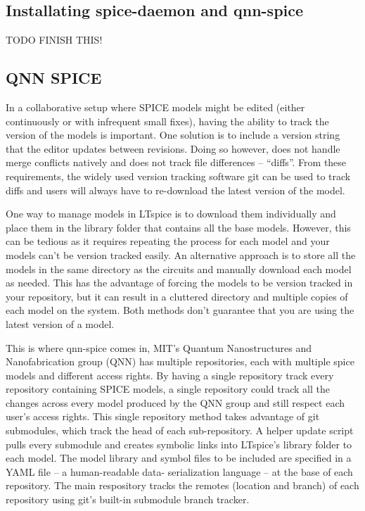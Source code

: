 







\subsection{Installating spice-daemon and qnn-spice}

TODO FINISH THIS!

\subsection{QNN SPICE} \label{qnn-spice}

In a collaborative setup where SPICE models might be edited (either continuously or with infrequent small fixes), 
having the ability to track the version of the models is important. One solution is to include a version 
string that the editor updates between revisions. Doing so however, does not handle merge conflicts natively and
does not track file differences -- ``diffs''. From these requirements, the widely used version tracking software git can be
used to track diffs and users will always have to re-download the latest version of the model.

One way to manage models in LTspice is to download them individually and place them in the library folder that contains 
all the base models. However, this can be tedious as it requires repeating the process for each model and your
models can't be version tracked easily. An alternative
approach is to store all the models in the same directory as the circuits and manually download each model as needed. 
This has the advantage of forcing the models to be version tracked in your repository, but it can result in a cluttered 
directory and multiple copies of each model on the system. Both methods don't guarantee that you are using the latest
version of a model.

This is where qnn-spice comes in, MIT's Quantum Nanostructures and Nanofabrication group (QNN) has multiple
repositories, each with multiple spice models and different access rights. By having a single repository track every repository containing
SPICE models, a single repository could track all the changes across every model produced by the QNN group and still respect each user's access rights. 
This single repository method takes advantage of git submodules, which track the head of each sub-repository.
A helper update script pulls every submodule and creates symbolic links into LTspice's library folder to each model.
The model library and symbol files to be included are specified in a YAML file -- a human-readable data-
serialization language -- at the base of each repository. The main respository tracks the
remotes (location and branch) of each repository using git's built-in submodule branch tracker.

